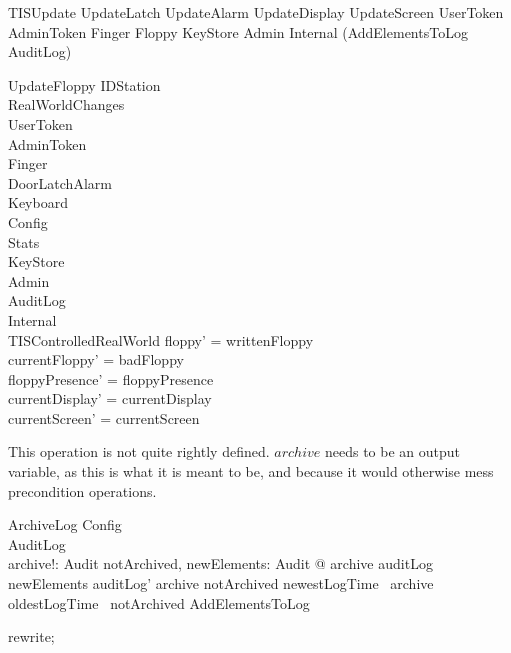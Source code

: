 \begin{zed}
TISUpdate  UpdateLatch \land  UpdateAlarm \land  UpdateDisplay \land  UpdateScreen \land  \Xi UserToken \land  \Xi AdminToken \land  \Xi Finger \land  \Xi Floppy \land  \Xi KeyStore \land  \Xi Admin \land  \Xi Internal \land  (AddElementsToLog \lor  \Xi AuditLog)
\end{zed}

\begin{schema}{UpdateFloppy}
  \Delta IDStation\\
  RealWorldChanges\\
  \Xi UserToken\\
  \Xi AdminToken\\
  \Xi Finger\\
  \Xi DoorLatchAlarm\\
  \Xi Keyboard\\
  \Xi Config\\
  \Xi Stats\\
  \Xi KeyStore\\
  \Xi Admin\\
  \Xi AuditLog\\
  \Xi Internal\\
  \Xi TISControlledRealWorld
\where
  floppy' = writtenFloppy\\
  currentFloppy' = badFloppy\\
  floppyPresence' = floppyPresence\\
  currentDisplay' = currentDisplay\\
  currentScreen' = currentScreen
\end{schema}

This operation is not quite rightly defined. $archive$ needs to be an
output variable, as this is what it is meant to be, and because it would
otherwise mess precondition operations.
%
\begin{schema}{ArchiveLog}
  Config\\
  \Delta AuditLog\\
  archive!: \finset  Audit
\where
  \exists  notArchived, newElements: \finset  Audit @ archive \subseteq  auditLog \cup  newElements \land  auditLog' \subseteq  archive \cup  notArchived \land  newestLogTime~ archive \leq  oldestLogTime~ notArchived \land  AddElementsToLog
\end{schema}

\begin{zproof}
rewrite;
\end{zproof}

